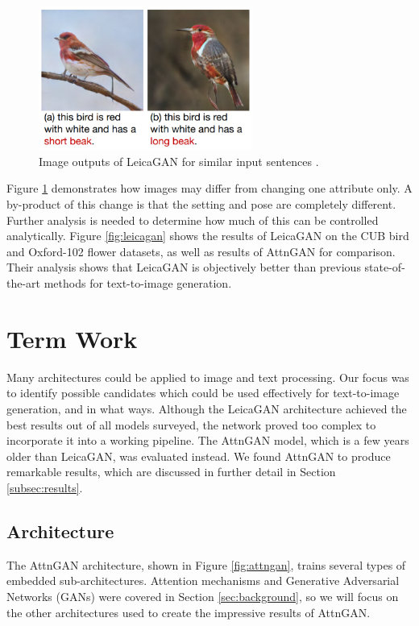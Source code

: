\documentclass[letterpaper]{article} %
\begin{document}
\begin{figure}[htbp]
\centerline{\includegraphics[width=7cm]{leicagan_sample.png}}
\caption{Image outputs of LeicaGAN for similar input sentences
\cite{leica}.}
\label{fig:leica_sample}
\end{figure}

Figure \ref{fig:leica_sample} demonstrates how images may differ from changing 
one attribute only. A by-product of this change is that the setting and pose 
are completely different. Further analysis is needed to determine how much of 
this can be controlled analytically. Figure \ref{fig:leicagan} shows the 
results of LeicaGAN on the CUB bird and Oxford-102 flower datasets, as well as 
results of AttnGAN for comparison. Their analysis shows that LeicaGAN is 
objectively better than previous state-of-the-art methods for text-to-image 
generation.

\section{Term Work}
Many architectures could be applied to image and text processing. Our focus was 
to identify possible candidates which could be used effectively for 
text-to-image generation, and in what ways. Although the LeicaGAN architecture 
achieved the best results out of all models 
surveyed, the network proved too complex to incorporate it into a working 
pipeline. The AttnGAN model, which is a few years older than LeicaGAN, was 
evaluated instead. We found AttnGAN to produce remarkable results, which are 
discussed in further detail in Section \ref{subsec:results}.

\subsection{Architecture}
The AttnGAN architecture, shown in Figure \ref{fig:attngan}, trains several 
types of embedded sub-architectures. Attention mechanisms and Generative 
Adversarial Networks (GANs) were covered in Section \ref{sec:background}, so we 
will focus on the other architectures used to create the impressive results of 
AttnGAN.
\end{document}

